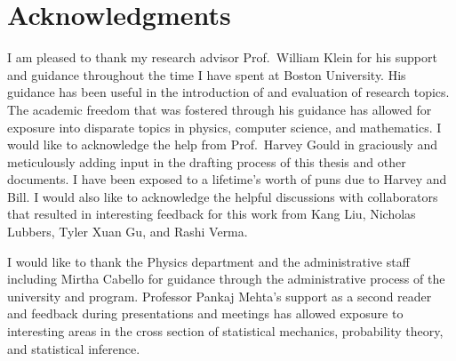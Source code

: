 

\maketitle


\copyrightpage


\approvalpage


\newpage

\section*{Acknowledgments}
I am pleased to thank my research advisor Prof.\ William Klein for his support and guidance throughout the time I have spent at Boston University. His guidance has been useful in the introduction of and evaluation of research topics. The academic freedom that was fostered through his guidance has allowed for exposure into disparate topics in physics, computer science, and mathematics. I would like to acknowledge the help from  Prof.\ Harvey Gould in graciously and meticulously adding input in the drafting process of this thesis and other documents. I have been exposed to a lifetime's worth of puns due to Harvey and Bill. I would also like to acknowledge the helpful discussions with collaborators that resulted in interesting feedback for this work from Kang Liu, Nicholas Lubbers, Tyler Xuan Gu, and Rashi Verma. 

I would like to thank the Physics department and the administrative staff including Mirtha Cabello for guidance through the administrative process of the university and program. Professor Pankaj Mehta's support as a second reader and feedback during presentations and meetings has allowed  exposure to interesting areas in the cross section of statistical mechanics, probability theory, and statistical inference.

